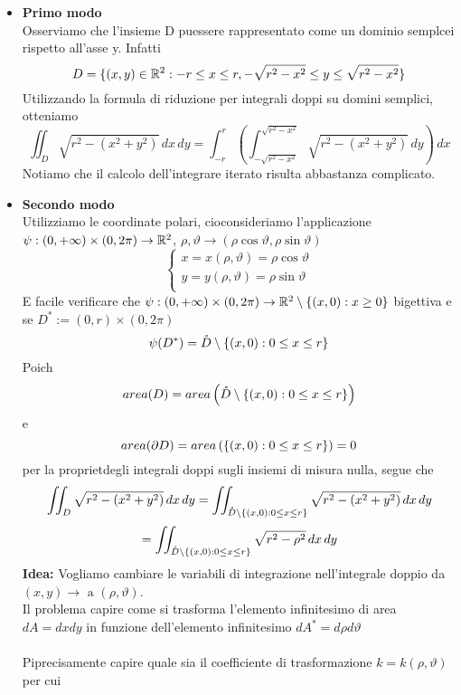 \begin{itemize}
  \item \textbf{Primo modo} \\
        Osserviamo che l'insieme D pu\aco essere rappresentato come un dominio semplcei rispetto all'asse y.
        Infatti $$D = \{(x,y)\in\mathbb{R}^2 : -r \leq x \leq r, -\sqrt{r^2-x^2} \leq y \leq \sqrt{r^2-x^2}\}$$
        Utilizzando la formula di riduzione per integrali doppi su domini semplici, otteniamo
        $$\iint_{D} \sqrt{r^2-(x^2+y^2)}\,dx\,dy = \int_{-r}^{r}\left(\int_{-\sqrt{r^2-x^2}}^{\sqrt{r^2-x^2}} 
        \sqrt{r^2-(x^2+y^2)} \, dy \right)\,dx$$
        Notiamo che il calcolo dell'integrare iterato risulta abbastanza complicato.
  \item \textbf{Secondo modo} \\
        Utilizziamo le coordinate polari, cio\ace consideriamo l'applicazione 
        $\psi : (0,+\infty)\times(0,2\pi) \to \mathbb{R}^2$, $\rho, \vartheta \to (\rho\cos\vartheta, \rho\sin\vartheta)$
        $$\left\{\begin{array}{l}
          x = x(\rho,\vartheta) = \rho\cos\vartheta \\
          y = y(\rho,\vartheta) = \rho\sin\vartheta \\
        \end{array}\right.$$
        \ac{E} facile verificare che $\psi:(0,+\infty)\times(0,2\pi) \to \mathbb{R}^2 \setminus\{(x,0): x \geq 0\}$
        \ace bigettiva e se $D^{*}:= (0,r)\times(0,2\pi)$
        $$\psi(D^*) = \mathring{D}\setminus\{(x,0):  0\leq x\leq r\}$$
        Poich\ace $$area(D) = area\left(\mathring{D}\setminus\left\{(x,0):  0\leq x\leq r\right\}\right)$$ e 
        $$area(\partial D) = area\left(\{(x,0):  0\leq x\leq r\}\right) = 0$$
        per la propriet\aca degli integrali doppi sugli insiemi di misura nulla, segue che
        $$\iint_{D} \sqrt{r^2-(x^2+y^2)}\,dx\,dy = \iint_{\mathring{D}\setminus\{(x,0): 0 \leq x \leq r\}}\sqrt{r^2-(x^2+y^2)}\,dx\,dy$$
        $$= \iint_{\mathring{D}\setminus\{(x,0): 0 \leq x \leq r\}}\sqrt{r^2-\rho^2}\,dx\,dy$$  
        \textbf{Idea:} Vogliamo cambiare le variabili di integrazione nell'integrale doppio 
        da $(x,y) \rightarrow \text{ a } (\rho,\vartheta)$. \\
        Il problema \ace capire come si trasforma l'elemento infinitesimo di area $dA = dxdy$ in funzione
        dell'elemento infinitesimo $dA^* = d\rho d\vartheta$\\\\
        Pi\acu precisamente capire quale sia il coefficiente di trasformazione $k = k(\rho,\vartheta)$ per cui 

\end{itemize}

